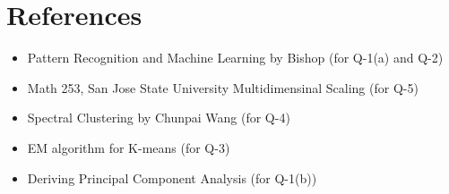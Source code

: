 \section*{References}

\begin{itemize}
    \item Pattern Recognition and Machine Learning by Bishop (for Q-1(a) and Q-2)
    \item Math 253, San Jose State University Multidimensinal Scaling (for Q-5)
    \item Spectral Clustering by Chunpai Wang (for Q-4)
    \item EM algorithm for K-means (for Q-3)
    \item Deriving Principal Component Analysis (for Q-1(b))
\end{itemize}
